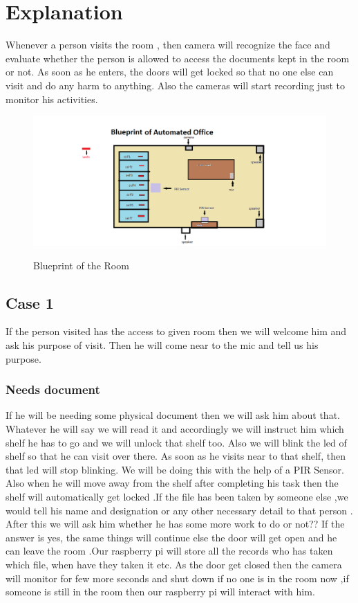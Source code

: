 \documentclass[12pt]{article}
\begin{document}
\newpage
\section{Explanation}
Whenever a person visits the room , then camera will recognize the face and evaluate whether the person is allowed to access the documents kept in the room or not. As soon as he enters, the doors will get locked so that no one else can visit and do any harm to anything. Also the cameras will start recording just to monitor his activities.\\[0.5cm]


\begin{figure}[!h]
	\centering
	{
		\includegraphics[width=5in]{main_room.png}
	}
	\caption{Blueprint of the Room}
	\label{Figure1}
\end{figure}


\subsection{Case 1}
If the person visited has the access to given room then we will welcome him and ask his purpose of visit. Then he will come near to the mic and tell us his purpose.

\subsubsection{Needs document}
If he will be needing some physical document then we will ask him about that. Whatever he will say we will read it and accordingly we will instruct him which shelf he has to go and we will unlock that shelf too. Also we will blink the led of shelf so that he can visit over there. As soon as he visits near to that shelf, then that led will stop blinking. We will be doing this with the help of a PIR Sensor. Also when he will move away from the shelf after completing his task then the shelf will automatically get locked .If the file has been taken by someone else ,we would tell his name and designation or any other necessary detail to that person . After this we will ask him whether he has some more work to do or not?? If the answer is yes, the same things will continue else the door will get open and he can leave the room .Our raspberry pi will store all the records who has taken which file, when have they taken it etc. As the door get closed then the camera will monitor for few more seconds and shut down if no one is in the room now ,if someone is still in the room then our raspberry pi will interact with him.
   
\end{document}
